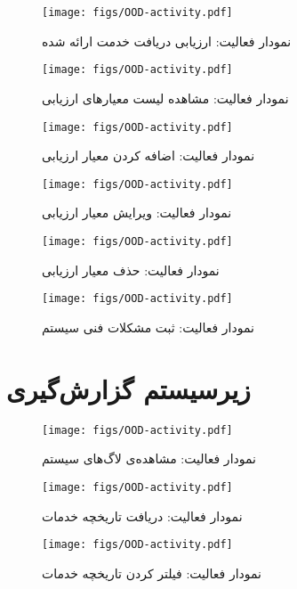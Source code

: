\begin{figure}
	\centering
	\texttt{[image: figs/OOD-activity.pdf]}
	\caption{نمودار فعالیت: ارزیابی دریافت خدمت ارائه شده}
\end{figure}
\FloatBarrier
\newpage

\begin{figure}
	\centering
	\texttt{[image: figs/OOD-activity.pdf]}
	\caption{نمودار فعالیت: مشاهده لیست معیارهای ارزیابی}
\end{figure}
\FloatBarrier
\newpage

\begin{figure}
	\centering
	\texttt{[image: figs/OOD-activity.pdf]}
	\caption{نمودار فعالیت: اضافه کردن معیار ارزیابی}
\end{figure}
\FloatBarrier
\newpage

\begin{figure}
	\centering
	\texttt{[image: figs/OOD-activity.pdf]}
	\caption{نمودار فعالیت: ویرایش معیار ارزیابی}
\end{figure}
\FloatBarrier
\newpage

\begin{figure}
	\centering
	\texttt{[image: figs/OOD-activity.pdf]}
	\caption{نمودار فعالیت: حذف معیار ارزیابی}
\end{figure}
\FloatBarrier
\newpage

\begin{figure}
	\centering
	\texttt{[image: figs/OOD-activity.pdf]}
	\caption{نمودار فعالیت: ثبت مشکلات فنی سیستم}
\end{figure}
\FloatBarrier
\newpage


\section{زیرسیستم گزارش‌گیری}

\begin{figure}
	\centering
	\texttt{[image: figs/OOD-activity.pdf]}
	\caption{نمودار فعالیت: مشاهده‌ی لاگ‌های سیستم}
\end{figure}
\FloatBarrier
\newpage

\begin{figure}
	\centering
	\texttt{[image: figs/OOD-activity.pdf]}
	\caption{نمودار فعالیت: دریافت تاریخچه خدمات}
\end{figure}
\FloatBarrier
\newpage

\begin{figure}
	\centering
	\texttt{[image: figs/OOD-activity.pdf]}
	\caption{نمودار فعالیت: فیلتر کردن تاریخچه خدمات}
\end{figure}
\FloatBarrier
\newpage

